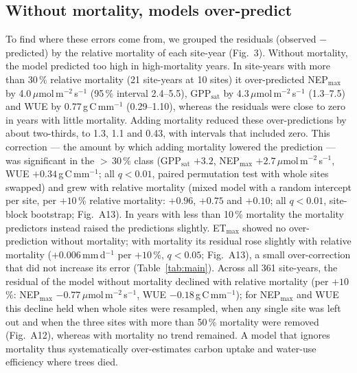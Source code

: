 \documentclass[11pt,a4paper]{article}
\begin{document}
\subsection*{Without mortality, models over-predict}
To find where these errors come from, we grouped the residuals (observed $-$ predicted) by the relative mortality of
each site-year (Fig.~3). Without mortality, the model predicted too high in high-mortality years. In site-years with more
than 30\,\% relative mortality (21 site-years at 10 sites) it over-predicted NEP$_\mathrm{max}$ by 4.0\,$\mu$mol\,m$^{-2}$\,s$^{-1}$ (95\,\% interval
2.4--5.5), GPP$_\mathrm{sat}$ by 4.3\,$\mu$mol\,m$^{-2}$\,s$^{-1}$ (1.3--7.5) and WUE by 0.77\,g\,C\,mm$^{-1}$ (0.29--1.10), whereas the residuals were close to zero in years
with little mortality. Adding mortality reduced these over-predictions by about two-thirds, to 1.3, 1.1 and 0.43, with
intervals that included zero. This correction --- the amount by which adding mortality lowered the prediction --- was
significant in the $>$\,30\,\% class (GPP$_\mathrm{sat}$ $+3.2$, NEP$_\mathrm{max}$ $+2.7$\,$\mu$mol\,m$^{-2}$\,s$^{-1}$, WUE $+0.34$\,g\,C\,mm$^{-1}$; all $q<0.01$, paired permutation test
with whole sites swapped) and grew with relative mortality (mixed model with a random intercept per site, per
$+10$\,\% relative mortality: $+0.96$, $+0.75$ and $+0.10$; all $q<0.01$, site-block bootstrap; Fig.~A13). In years with less than 10\,\% mortality the
mortality predictors instead raised the predictions slightly. ET$_\mathrm{max}$ showed no over-prediction without mortality; with mortality its residual rose slightly with relative mortality ($+0.006$\,mm\,d$^{-1}$ per $+10$\,\%, $q<0.05$; Fig.~A13), a small over-correction that did not increase its error (Table~\ref{tab:main}). Across all 361 site-years, the
residual of the model without mortality declined with relative mortality (per $+10$\,\%: NEP$_\mathrm{max}$ $-0.77$\,$\mu$mol\,m$^{-2}$\,s$^{-1}$, WUE
$-0.18$\,g\,C\,mm$^{-1}$); for NEP$_\mathrm{max}$ and WUE this decline held when whole sites were resampled, when any single site was left out and
when the three sites with more than 50\,\% mortality were removed (Fig.~A12), whereas with mortality no trend remained.
A model that ignores mortality thus systematically over-estimates carbon uptake and water-use efficiency where trees
died.
\end{document}
